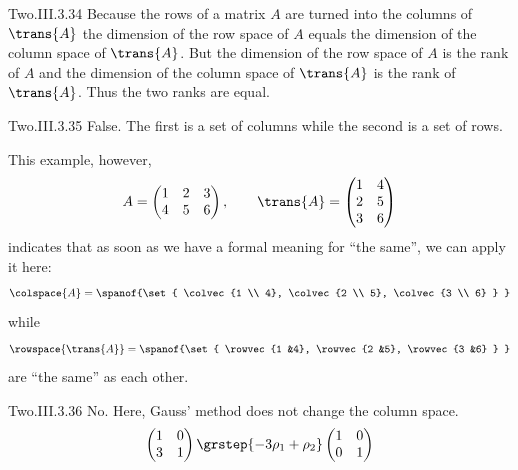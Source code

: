 \begin{ans}{Two.III.3.34}
      Because the rows of a matrix \( A \) are turned into the columns
      of \( \trans{A} \) the dimension of the row space of \( A \) equals
      the dimension of the column space of \( \trans{A} \).
      But the dimension of the row space of \( A \) is the rank of \( A \) and
      the dimension of the column space of \( \trans{A} \) is the rank of
      \( \trans{A} \).
      Thus the two ranks are equal.
    
\end{ans}
\begin{ans}{Two.III.3.35}
      False.
      The first is a set of columns while the second is a set of rows.

      This example, however,
      \begin{equation*}
         A=\begin{pmatrix}
             1  &2  &3  \\
             4  &5  &6
           \end{pmatrix},
         \qquad
         \trans{A}=\begin{pmatrix}
             1  &4  \\
             2  &5  \\
             3  &6
           \end{pmatrix}
      \end{equation*}
      indicates that as soon as we have a formal meaning for ``the same'',
      we can apply it here:
      \begin{equation*}
        \colspace{A}=\spanof{\set{
                        \colvec{1 \\ 4},
                        \colvec{2 \\ 5},
                        \colvec{3 \\ 6} }  }
      \end{equation*}
      while
      \begin{equation*}
         \rowspace{\trans{A}}=\spanof{\set{
                                 \rowvec{1 &4},
                                 \rowvec{2 &5},
                                 \rowvec{3 &6} }  }
      \end{equation*}
      are ``the same'' as each other.
    
\end{ans}
\begin{ans}{Two.III.3.36}
      No.
      Here, Gauss' method does not change the column space.
      \begin{equation*}
        \begin{pmatrix}
          1  &0  \\
          3  &1
        \end{pmatrix}
        \grstep{-3\rho_1+\rho_2}
        \begin{pmatrix}
          1  &0  \\
          0  &1
        \end{pmatrix}
      \end{equation*}
    
\end{ans}
